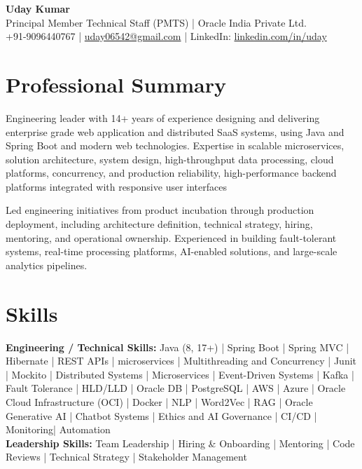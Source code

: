 \documentclass[11pt,a4paper]{article}
\begin{document}
\begin{center}
    {\LARGE \textbf{Uday Kumar}} \\[4pt]
    
     Principal Member Technical Staff (PMTS) \; | \; Oracle India Private Ltd. \\[4pt]
    
    +91-9096440767 \; | \;
    \href{mailto:uday06542@gmail.com}{uday06542@gmail.com}
    \; | \;
    LinkedIn:
    \href{https://www.linkedin.com/in/uday/}{linkedin.com/in/uday}
\end{center}

\section*{Professional Summary}

Engineering leader with 14+ years of experience designing and delivering enterprise grade web application and  distributed SaaS systems, using Java and Spring Boot and modern web technologies. Expertise in scalable microservices, solution architecture, system design, high-throughput data processing, cloud platforms, concurrency, and production reliability, high-performance backend platforms integrated with responsive user interfaces

Led engineering initiatives from product incubation through production deployment, including architecture definition, technical strategy, hiring, mentoring, and operational ownership. Experienced in building fault-tolerant systems, real-time processing platforms, AI-enabled solutions, and large-scale analytics pipelines.

\section*{Skills}

\textbf{Engineering / Technical Skills:} Java (8, 17+) | Spring Boot | Spring MVC | Hibernate | REST APIs | microservices | Multithreading and Concurrency | Junit | 
Mockito | Distributed Systems | Microservices | Event-Driven Systems | Kafka | Fault Tolerance | HLD/LLD | Oracle DB | PostgreSQL | AWS | Azure | Oracle Cloud Infrastructure (OCI) | Docker | NLP | Word2Vec | RAG | Oracle Generative AI | Chatbot Systems | Ethics and AI Governance | CI/CD | Monitoring| Automation \\
\textbf{Leadership Skills:} Team Leadership | Hiring \& Onboarding | Mentoring | Code Reviews | Technical Strategy | Stakeholder Management \\
\end{document}
